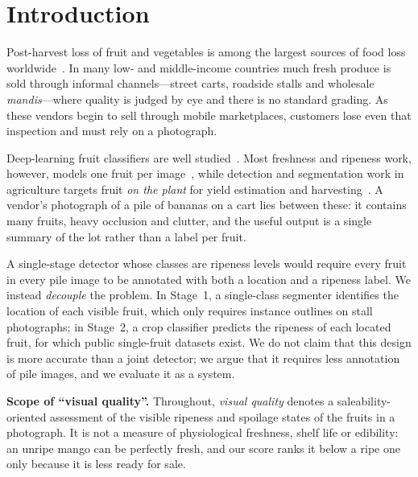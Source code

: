 \documentclass[10pt,twocolumn]{article}
\begin{document}
\section{Introduction}
Post-harvest loss of fruit and vegetables is among the largest sources of food loss worldwide~\cite{fao2019}. In many low- and middle-income countries much fresh produce is sold through informal channels---street carts, roadside stalls and wholesale \emph{mandis}---where quality is judged by eye and there is no standard grading. As these vendors begin to sell through mobile marketplaces, customers lose even that inspection and must rely on a photograph.

Deep-learning fruit classifiers are well studied~\cite{kamilaris2018,koirala2019}. Most freshness and ripeness work, however, models one fruit per image~\cite{muresan2018,bird2022,vegnet}, while detection and segmentation work in agriculture targets fruit \emph{on the plant} for yield estimation and harvesting~\cite{sa2016,bargoti2017,liu2020yolotomato}. A vendor's photograph of a pile of bananas on a cart lies between these: it contains many fruits, heavy occlusion and clutter, and the useful output is a single summary of the lot rather than a label per fruit.

A single-stage detector whose classes are ripeness levels would require every fruit in every pile image to be annotated with both a location and a ripeness label. We instead \emph{decouple} the problem. In Stage~1, a single-class segmenter identifies the location of each visible fruit, which only requires instance outlines on stall photographs; in Stage~2, a crop classifier predicts the ripeness of each located fruit, for which public single-fruit datasets exist. We do not claim that this design is more accurate than a joint detector; we argue that it requires less annotation of pile images, and we evaluate it as a system.

\textbf{Scope of ``visual quality''.} Throughout, \emph{visual quality} denotes a saleability-oriented assessment of the visible ripeness and spoilage states of the fruits in a photograph. It is not a measure of physiological freshness, shelf life or edibility: an unripe mango can be perfectly fresh, and our score ranks it below a ripe one only because it is less ready for sale.
\end{document}
